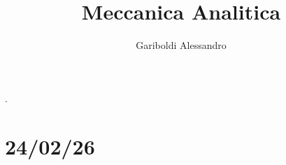 \documentclass[a4paper, oneside]{article}
\title{Meccanica Analitica}
\author{Gariboldi Alessandro}
\date{ }
\begin{document}
                {}          %
                {}          %
                {\slshape}  %
                {}          %
                {\bfseries} %
                {.}         %
                {\newline}         %
                {}          %
\theoremstyle{theoremEnv}

\newtheorem{definition}{Definizione}[section]
\newtheorem{theorem}{Teorema}[section]
\newtheorem{lemma}{Lemma}[section]
\newtheorem{observation}{Oss.}[section]
\newtheorem{corollary}{Corollario}[theorem]
\newtheorem{example}{Esempio}[section]
\newtheorem{problem}{Problema}[section]
\newtheorem{solution}{Soluzione}[section]
\newtheorem{proposition}{Proposizione}[section]


\maketitle
\section{24/02/26}
\end{document}
